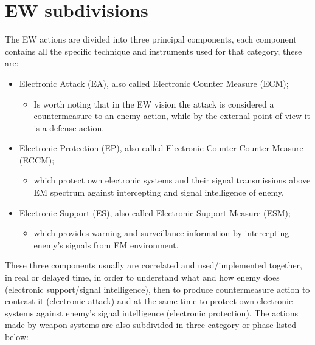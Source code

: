 \documentclass[12pt]{report}
\begin{document}
\section{EW subdivisions}
The EW actions are divided into three principal components, each component contains all the specific technique and instruments used for that category, these are:
\begin{itemize}
\item Electronic Attack (EA), also called Electronic Counter Measure (ECM);
    \begin{itemize}
      \item Is worth noting that in the EW vision the attack is considered a countermeasure to an enemy action, while by the external point of view it is a defense action. 
      \end{itemize}
\item Electronic Protection (EP), also called Electronic Counter Counter Measure (ECCM);
    \begin{itemize}
      \item which protect own electronic systems and their signal transmissions above EM spectrum against intercepting and signal intelligence of enemy.
      \end{itemize}
\item Electronic Support (ES), also called Electronic Support Measure (ESM);
    \begin{itemize}
     \item which provides warning and surveillance information by intercepting enemy's signals from EM environment.
     \end{itemize}
\end{itemize}
These three components usually are correlated and used/implemented together, in real or delayed time, in order to understand what and how enemy does (electronic support/signal intelligence), then to produce countermeasure action to contrast it (electronic attack) and at the same time to protect own electronic systems against enemy's signal intelligence (electronic protection). The actions made by weapon systems are also subdivided in three category or phase listed below:
\end{document}
